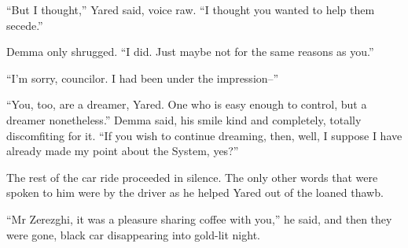 ``But I thought,'' Yared said, voice raw. ``I thought you wanted to help them secede.''

Demma only shrugged. ``I did. Just maybe not for the same reasons as you.''

``I'm sorry, councilor. I had been under the impression--''

``You, too, are a dreamer, Yared. One who is easy enough to control, but a dreamer nonetheless.'' Demma said, his smile kind and completely, totally discomfiting for it. ``If you wish to continue dreaming, then, well, I suppose I have already made my point about the System, yes?''

The rest of the car ride proceeded in silence. The only other words that were spoken to him were by the driver as he helped Yared out of the loaned thawb.

``Mr Zerezghi, it was a pleasure sharing coffee with you,'' he said, and then they were gone, black car disappearing into gold-lit night.
